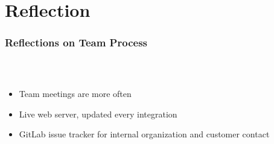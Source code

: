 \section{Reflection}

\begin{frame}
  \frametitle{Reflections on Team Process}
  \begin{columns}
  	\begin{column}{0.8\textwidth}
   	  \begin{description}[]
        \item[Workflow] \hfill \\
        \begin{itemize}
          \item Team meetings are more often
          \item Live web server, updated every integration
          \item GitLab issue tracker for internal organization and customer contact
        \end{itemize}
  

\end{description}
\end{column}
\end{columns}
\end{frame}
